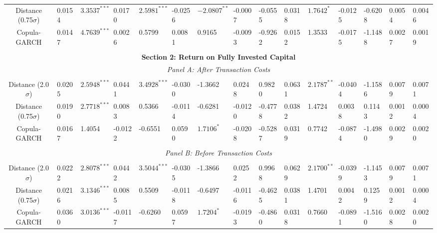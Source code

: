 \documentclass[a4paper]{article}
\begin{document}
\begin{sidewaystable}
\begin{threeparttable}[H]
\begin{tabularx}{\textwidth}{@{\extracolsep{\fill}}lllllllllllllll@{}}
			\multicolumn{1}{c}{Distance (0.75$\sigma$)} & 0.0154 & $3.3537^{***}$ & 0.0170 & $2.5981^{***}$ & -0.0256 & $-2.0807^{**}$ & -0.0007 & -0.0555 & 0.0318 & $1.7642^{*}$ & -0.0125 & -0.6208 & 0.0054 & 0.0046 \\
			\multicolumn{1}{c}{Copula-GARCH} & 0.0147 & $4.7639^{***}$ & 0.0026 & 0.5799 & 0.0081 & 0.9165 & -0.0093 & -0.9262 & 0.0152 & 1.3533 & -0.0175 & -1.1488 & 0.0027 & 0.0019 \\
			&       &       &       &       &       &       &       &       &       &       &       &       &       &  \\
			\midrule
			\multicolumn{15}{c}{\textbf{Section 2: Return on Fully Invested Capital}} \\
			\multicolumn{15}{c}{\textit{Panel A: After Transaction Costs}} \\
			&       &       &       &       &       &       &       &       &       &       &       &       &       &  \\
			\multicolumn{1}{c}{Distance (2.0$\sigma$)} & 0.0205 & $2.5948^{***}$ & 0.0441 & $3.4928^{***}$ & -0.0300 & -1.3662 & 0.0248 & 0.9820 & 0.0631 & $2.1787^{**}$ & -0.0404 & -1.1586 & 0.0079 & 0.0071 \\
			\multicolumn{1}{c}{Distance (0.75$\sigma$)} & 0.0190 & $2.7718^{***}$ & 0.0083 & 0.5366 & -0.0114 & -0.6281 & -0.0120 & -0.4778 & 0.0382 & 1.4724 & 0.0038 & 0.1143 & 0.0012 & 0.0004 \\
			\multicolumn{1}{c}{Copula-GARCH} & 0.0167 & 1.4054 & -0.0122 & -0.6551 & 0.0590 & $1.7106^{*}$ & -0.0208 & -0.5287 & 0.0319 & 0.7742 & -0.0874 & -1.4980 & 0.0029 & 0.0020 \\
			&       &       &       &       &       &       &       &       &       &       &       &       &       &  \\
			\multicolumn{15}{c}{\textit{Panel B: Before Transaction Costs}} \\
			&       &       &       &       &       &       &       &       &       &       &       &       &       &  \\
			\multicolumn{1}{c}{Distance (2.0$\sigma$)} & 0.0222 & $2.8078^{***}$ & 0.0442 & $3.5044^{***}$ & -0.0305 & -1.3866 & 0.0252 & 0.9968 & 0.0629 & $2.1700^{**}$ & -0.0399 & -1.1453 & 0.0079 & 0.0071 \\
			\multicolumn{1}{c}{Distance (0.75$\sigma$)} & 0.0216 & $3.1346^{***}$ & 0.0085 & 0.5509 & -0.0118 & -0.6497 & -0.0116 & -0.4625 & 0.0381 & 1.4701 & 0.0042 & 0.1259 & 0.0012 & 0.0004 \\
			\multicolumn{1}{c}{Copula-GARCH} & 0.0360 & $3.0136^{***}$ & -0.0117 & -0.6260 & 0.0597 & $1.7204^{*}$ & -0.0193 & -0.4860 & 0.0318 & 0.7660 & -0.0891 & -1.5160 & 0.0028 & 0.0020 \\

\end{tabularx}
\end{threeparttable}
\end{sidewaystable}
\end{document}
